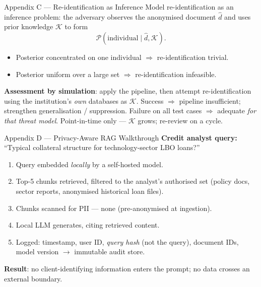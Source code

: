 \documentclass[9pt,t]{beamer}
\begin{document}
\begin{frame}[noframenumbering]{Appendix C --- Re-identification as Inference}
Model re-identification as an inference problem: the adversary observes the
anonymised document $\hat{d}$ and uses prior knowledge $\mathcal{K}$ to form
\[
\mathcal{P}(\text{individual} \mid \hat{d}, \mathcal{K}).
\]
\begin{itemize}
  \item Posterior concentrated on one individual $\Rightarrow$ re-identification trivial.
  \item Posterior uniform over a large set $\Rightarrow$ re-identification infeasible.
\end{itemize}

\medskip
\textbf{Assessment by simulation}: apply the pipeline, then attempt re-identification
using the institution's \emph{own} databases as $\mathcal{K}$. Success $\Rightarrow$
pipeline insufficient; strengthen generalisation / suppression. Failure on all test
cases $\Rightarrow$ adequate \emph{for that threat model}. Point-in-time only ---
$\mathcal{K}$ grows; re-review on a cycle.
\end{frame}

\begin{frame}[noframenumbering]{Appendix D --- Privacy-Aware RAG Walkthrough}
\textbf{Credit analyst query:} ``Typical collateral structure for technology-sector LBO loans?''
\begin{enumerate}
  \item Query embedded \emph{locally} by a self-hosted model.
  \item Top-5 chunks retrieved, filtered to the analyst's authorised set (policy docs,
        sector reports, anonymised historical loan files).
  \item Chunks scanned for PII --- none (pre-anonymised at ingestion).
  \item Local LLM generates, citing retrieved content.
  \item Logged: timestamp, user ID, \emph{query hash} (not the query), document IDs,
        model version $\to$ immutable audit store.
\end{enumerate}

\medskip
\textbf{Result}: no client-identifying information enters the prompt; no data crosses
an external boundary.
\end{frame}
\end{document}
